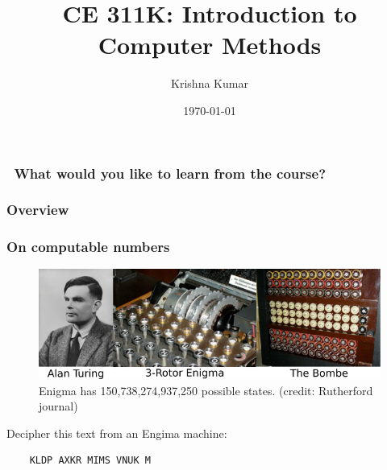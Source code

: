 \documentclass[notes]{beamer}
\title[CE 311K: Intro to Computer Methods]{CE 311K: Introduction to Computer Methods}
\author{Krishna Kumar} %
\institute[UT Austin] %
{
University of Texas at Austin \\
\medskip
\href{mailto:krishnak@utexas.edu}{krishnak@utexas.edu} %
}
\date{\today} %
\begin{document}
\begin{frame}
\titlepage %
\end{frame}

\begin{frame}
	\frametitle{\faCommentsO ~What would you like to learn from the course?}
\end{frame}

\begin{frame}
 \frametitle{Overview}
 \tableofcontents
\end{frame}

\newif\ifshowtoc
\showtoctrue%

\AtBeginSection{%
	\ifshowtoc
	\begin{frame}
		\tableofcontents[currentsection, subsectionstyle=show/show/hide]
	\end{frame}
	\fi
}

\begin{frame}[fragile]
	\frametitle{On computable numbers}
	\begin{figure}[ht]
		\centering
		\includegraphics[width=\textwidth]{figs/turing-bombe.png}
		\caption*{Enigma has 150,738,274,937,250 possible states. (credit: Rutherford journal)}
	\end{figure}
	Decipher this text from an Engima machine:
	\begin{verbatim}
	KLDP AXKR MIMS VNUK M
	\end{verbatim}
\end{frame}
\end{document}
